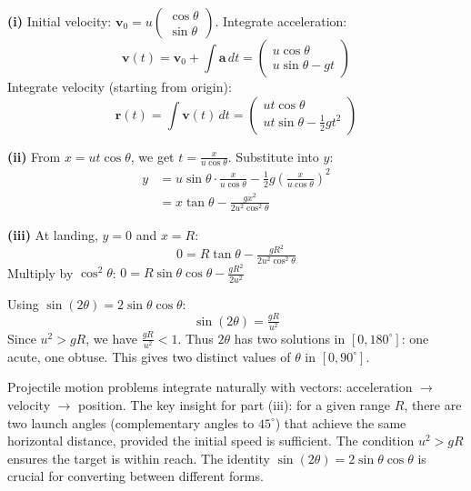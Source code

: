 \begin{solution}
\textbf{(i)} Initial velocity: $\mathbf{v}_0 = u\begin{pmatrix} \cos\theta \\ \sin\theta \end{pmatrix}$. Integrate acceleration:
$$\mathbf{v}(t) = \mathbf{v}_0 + \int \mathbf{a}\,dt = \begin{pmatrix} u\cos\theta \\ u\sin\theta - gt \end{pmatrix}$$
Integrate velocity (starting from origin):
$$\mathbf{r}(t) = \int \mathbf{v}(t)\,dt = \begin{pmatrix} ut\cos\theta \\ ut\sin\theta - \tfrac{1}{2}gt^2 \end{pmatrix}$$
\vspace{-2mm}

\textbf{(ii)} From $x = ut\cos\theta$, we get $t = \tfrac{x}{u\cos\theta}$. Substitute into $y$:
\vspace{-2mm}
\begin{align*}
y &= u\sin\theta \cdot \tfrac{x}{u\cos\theta} - \tfrac{1}{2}g\left(\tfrac{x}{u\cos\theta}\right)^2\\
&= x\tan\theta - \tfrac{gx^2}{2u^2\cos^2\theta}
\end{align*}

\textbf{(iii)} At landing, $y = 0$ and $x = R$:
$$0 = R\tan\theta - \tfrac{gR^2}{2u^2\cos^2\theta}$$
Multiply by $\cos^2\theta$: $0 = R\sin\theta\cos\theta - \tfrac{gR^2}{2u^2}$

Using $\sin(2\theta) = 2\sin\theta\cos\theta$:
$$\sin(2\theta) = \tfrac{gR}{u^2}$$
Since $u^2 > gR$, we have $\tfrac{gR}{u^2} < 1$. Thus $2\theta$ has two solutions in $[0, 180^\circ]$: one acute, one obtuse. This gives two distinct values of $\theta$ in $[0, 90^\circ]$.
\end{solution}

\begin{takeaways}
Projectile motion problems integrate naturally with vectors: acceleration $\to$ velocity $\to$ position. The key insight for part (iii): for a given range $R$, there are two launch angles (complementary angles to $45^\circ$) that achieve the same horizontal distance, provided the initial speed is sufficient. The condition $u^2 > gR$ ensures the target is within reach. The identity $\sin(2\theta) = 2\sin\theta\cos\theta$ is crucial for converting between different forms.
\end{takeaways}

